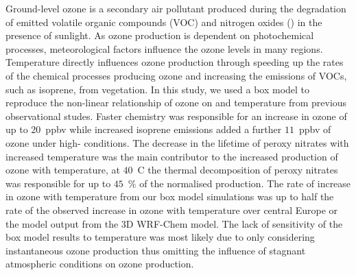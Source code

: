 Ground-level ozone is a secondary air pollutant produced during the degradation of emitted volatile organic compounds (VOC) and nitrogen oxides () in the presence of sunlight. 
As ozone production is dependent on photochemical processes, meteorological factors influence the ozone levels in many regions.
Temperature directly influences ozone production through speeding up the rates of the chemical processes producing ozone and increasing the emissions of VOCs, such as isoprene, from vegetation.
In this study, we used a box model to reproduce the non-linear relationship of ozone on  and temperature from previous observational studes.
Faster chemistry was responsible for an increase in ozone of up to $20$~ppbv while increased isoprene emissions added a further $11$~ppbv of ozone under high- conditions.
The decrease in the lifetime of peroxy nitrates with increased temperature was the main contributor to the increased production of ozone with temperature, at $40$~\degree C the thermal decomposition of peroxy nitrates was responsible for up to $45$~\% of the normalised  production.
The rate of increase in ozone with temperature from our box model simulations was up to half the rate of the observed increase in ozone with temperature over central Europe or the model output from the 3D WRF-Chem model.
The lack of sensitivity of the box model results to temperature was most likely due to only considering instantaneous ozone production thus omitting the influence of stagnant atmospheric conditions on ozone production.
